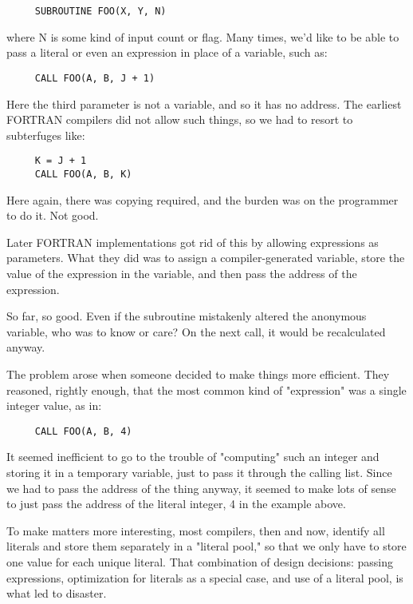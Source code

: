 \begin{verbatim}
     SUBROUTINE FOO(X, Y, N)
\end{verbatim}

where N is some kind of  input  count  or flag. Many times, we'd like  to be able to pass a literal or even an expression in place of a variable, such as:

\begin{verbatim}
     CALL FOO(A, B, J + 1)
\end{verbatim}

Here the third  parameter  is  not  a  variable, and so it has no address. The  earliest FORTRAN compilers did  not  allow  such things, so we had to resort to subterfuges like:

\begin{verbatim}
     K = J + 1
     CALL FOO(A, B, K)
\end{verbatim}

Here again, there was copying required, and the burden was on the programmer to do it. Not good.

Later  FORTRAN  implementations  got  rid  of  this  by  allowing expressions  as  parameters. What they  did  was  to  assign  a compiler-generated variable, store the value of the expression in the variable, and then pass the address of the expression.

So far, so good. Even if the subroutine mistakenly altered the anonymous variable, who was to know  or  care?  On the next call, it would be recalculated anyway.

The  problem  arose  when  someone  decided to make  things  more efficient. They  reasoned, rightly enough, that the most common kind of "expression" was a single integer value, as in:

\begin{verbatim}
     CALL FOO(A, B, 4)
\end{verbatim}

It seemed inefficient to go to the trouble of "computing" such an integer and storing it  in  a temporary variable, just to pass it through  the  calling  list. Since we had to pass the address of the  thing  anyway, it seemed to make lots of sense to just pass the address of the literal integer, 4 in the example above.

To make matters  more  interesting, most compilers, then and now, identify all literals and store  them  separately  in  a "literal pool,"  so that we only have to store one  value  for each unique literal. That  combination  of  design  decisions:     passing expressions, optimization for literals as a special case, and use of a literal pool, is what led to disaster.

